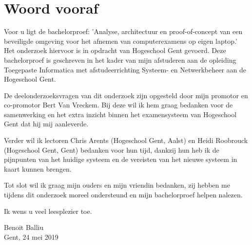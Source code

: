 
\chapter*{Woord vooraf}
\label{ch:voorwoord}


Voor u ligt de bachelorproef: 'Analyse, architectuur en proof-of-concept van een beveiligde omgeving voor het afnemen van computerexamens op eigen laptop.' Het onderzoek hiervoor is in opdracht van Hogeschool Gent gevoerd. Deze bachelorproef is geschreven in het kader van mijn afstuderen aan de opleiding Toegepaste Informatica met afstudeerrichting Systeem- en Netwerkbeheer aan de Hogeschool Gent.

De deelonderzoeksvragen van dit onderzoek zijn opgesteld door mijn promotor en co-promotor Bert Van Vreckem. Bij deze wil ik hem graag bedanken voor de samenwerking en het extra inzicht binnen het examensysteem van Hogeschool Gent dat hij mij aanleverde. 

Verder wil ik lectoren Chris Arents (Hogeschool Gent, Aalst) en Heidi Roobrouck (Hogeschool Gent, Gent) bedanken voor hun tijd, dankzij hun heb ik de pijnpunten van het huidige systeem en de vereisten van het nieuwe systeem in kaart kunnen brengen.

Tot slot wil ik graag mijn ouders en mijn vriendin bedanken, zij hebben me tijdens dit onderzoek moreel ondersteund en mijn bachelorproef helpen nalezen.

Ik wens u veel leesplezier toe.

Benoit Balliu \\
Gent, 24 mei 2019 